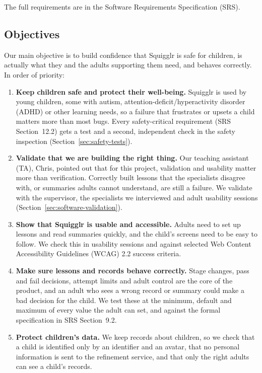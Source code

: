 \documentclass[12pt, titlepage]{article}
\begin{document}
The full requirements are in the Software Requirements Specification (SRS).

\subsection{Objectives}
\label{sec:objectives}

Our main objective is to build confidence that Squigglr is safe for children,
is actually what they and the adults supporting them need, and behaves
correctly. In order of priority:

\begin{enumerate}
  \item \textbf{Keep children safe and protect their well-being.} Squigglr is
    used by young children, some with autism, attention-deficit/hyperactivity
    disorder (ADHD) or other learning needs, so a failure that frustrates or
    upsets a child matters more than most bugs. Every safety-critical
    requirement (SRS Section~12.2) gets a test and a second, independent check
    in the safety inspection (Section~\ref{sec:safety-tests}).
  \item \textbf{Validate that we are building the right thing.} Our teaching
    assistant (TA), Chris, pointed out that for this project, validation and
    usability matter more than verification. Correctly built lessons that the
    specialists disagree with, or summaries adults cannot understand, are still
    a failure. We validate with the supervisor, the specialists we interviewed
    and adult usability sessions (Section~\ref{sec:software-validation}).
  \item \textbf{Show that Squigglr is usable and accessible.} Adults need to
    set up lessons and read summaries quickly, and the child's screens need to
    be easy to follow. We check this in usability sessions and against
    selected Web Content Accessibility Guidelines (WCAG) 2.2 success criteria.
  \item \textbf{Make sure lessons and records behave correctly.} Stage
    changes, pass and fail decisions, attempt limits and adult control are the
    core of the product, and an adult who sees a wrong record or summary could
    make a bad decision for the child. We test these at the minimum, default
    and maximum of every value the adult can set, and against the formal
    specification in SRS Section~9.2.
  \item \textbf{Protect children's data.} We keep records about children, so
    we check that a child is identified only by an identifier and an avatar,
    that no personal information is sent to the refinement service, and that
    only the right adults can see a child's records.
\end{enumerate}
\end{document}
